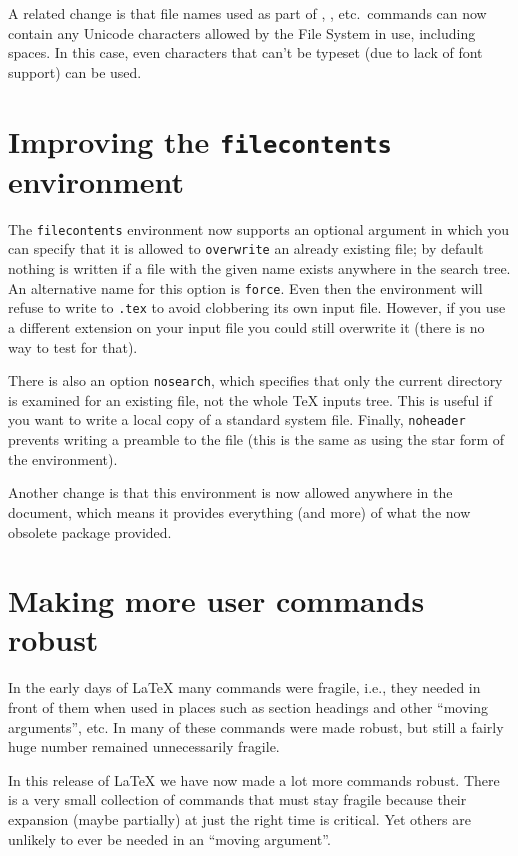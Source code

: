 \documentclass{ltnews}
\providecommand\option[1]{\texttt{#1}}
\providecommand\env[1]{\texttt{#1}}
\providecommand\env[1]{\texttt{#1}}
\begin{document}
A related change is that file names used as part of ,
, etc.\ commands 
can now contain any 
Unicode characters allowed by the File System in use,  
including spaces. 
In this case, 
 even characters that can't be typeset 
(due to lack of font support) can be used.


\section{Improving the \env{filecontents} environment}

The \env{filecontents} environment now supports an optional argument
in which you can specify that it is allowed to \option{overwrite} an
already existing file;  
 by default nothing is written if a file with the given name 
exists anywhere in the search tree. An alternative name for this
option is \texttt{force}.  
Even then the environment will refuse to write
to \texttt{.tex} to avoid clobbering its own input
file. However, if you use a different extension on your input file you
could still overwrite it (there is no way to test for that).

There is also an
option 
\option{nosearch}, 
which specifies that only the current directory is
examined for an existing file, not the whole \TeX{} inputs tree. 
This is useful if you want to write a
local copy of a standard system file.
Finally, \option{noheader} prevents writing a preamble to the file 
(this  
is the same as using the star form of the environment).

Another change is that this 
environment is 
now allowed anywhere in the document, 
which means
it provides everything (and more) of what the now obsolete 
 package provided.



\section{Making more user commands robust}

In the early days of \LaTeX{} many commands were fragile, i.e., they
needed  in front of them when used in places such as
section headings and other \enquote{moving arguments}, etc. 
In \LaTeXe{} many of these commands were made robust,  
but still a fairly huge number remained unnecessarily fragile.

In this release of \LaTeX{} we have now 
made a lot more commands robust.
There is a very small collection of commands that must stay fragile  
because their expansion (maybe partially) at just the right time is critical.
Yet others are unlikely to ever be needed in an \enquote{moving argument}.
\end{document}
